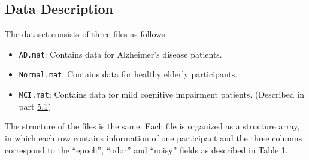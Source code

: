 \documentclass[12pt]{article}
\begin{document}
\subsection{Data Description}
\label{sec:sec3.2}
\cite{EEG-Dataset}
The dataset consists of three files as follows:

\begin{itemize}
	\item \texttt{AD.mat}: Contains data for Alzheimer’s disease patients.
	\item \texttt{Normal.mat}: Contains data for healthy elderly participants.
	\item \texttt{MCI.mat}: Contains data for mild cognitive impairment patients. (Described in part \hyperref[sec:5.1]{5.1})
\end{itemize}

The structure of the files is the same. Each file is organized as a structure array, in which each row contains information of one participant and the three columns correspond to the “epoch”, “odor” and “noisy” fields as described in Table 1.
\end{document}
